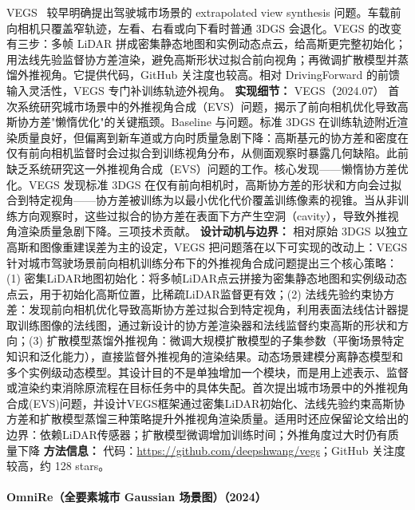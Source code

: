 VEGS~\cite{2407_02945} 较早明确提出驾驶城市场景的 extrapolated view synthesis 问题。车载前向相机只覆盖窄轨迹，左看、右看或向下看时普通 3DGS 会退化。VEGS 的改变有三步：多帧 LiDAR 拼成密集静态地图和实例动态点云，给高斯更完整初始化；用法线先验监督协方差渲染，避免高斯形状过拟合前向视角；再微调扩散模型并蒸馏外推视角。它提供代码，GitHub 关注度也较高。相对 DrivingForward 的前馈输入灵活性，VEGS 专门补训练轨迹外视角。
\textbf{实现细节：} VEGS（2024.07） 首次系统研究城市场景中的外推视角合成（EVS）问题，揭示了前向相机优化导致高斯协方差"懒惰优化"的关键瓶颈。Baseline 与问题。标准 3DGS 在训练轨迹附近渲染质量良好，但偏离到新车道或方向时质量急剧下降：高斯基元的协方差和密度在仅有前向相机监督时会过拟合到训练视角分布，从侧面观察时暴露几何缺陷。此前缺乏系统研究这一外推视角合成（EVS）问题的工作。核心发现——懒惰协方差优化。VEGS 发现标准 3DGS 在仅有前向相机时，高斯协方差的形状和方向会过拟合到特定视角——协方差被训练为以最小优化代价覆盖训练像素的视锥。当从非训练方向观察时，这些过拟合的协方差在表面下方产生空洞（cavity），导致外推视角渲染质量急剧下降。三项技术贡献。
\textbf{设计动机与边界：} 相对原始 3DGS 以独立高斯和图像重建误差为主的设定，VEGS 把问题落在以下可实现的改动上：VEGS针对城市驾驶场景前向相机训练分布下的外推视角合成问题提出三个核心策略：(1) 密集LiDAR地图初始化：将多帧LiDAR点云拼接为密集静态地图和实例级动态点云，用于初始化高斯位置，比稀疏LiDAR监督更有效；(2) 法线先验约束协方差：发现前向相机优化导致高斯协方差过拟合到特定视角，利用表面法线估计器提取训练图像的法线图，通过新设计的协方差渲染器和法线监督约束高斯的形状和方向；(3) 扩散模型蒸馏外推视角：微调大规模扩散模型的子集参数（平衡场景特定知识和泛化能力），直接监督外推视角的渲染结果。动态场景建模分离静态模型和多个实例级动态模型。其设计目的不是单独增加一个模块，而是用上述表示、监督或渲染约束消除原流程在目标任务中的具体失配。首次提出城市场景中的外推视角合成(EVS)问题，并设计VEGS框架通过密集LiDAR初始化、法线先验约束高斯协方差和扩散模型蒸馏三种策略提升外推视角渲染质量。适用时还应保留论文给出的边界：依赖LiDAR传感器；扩散模型微调增加训练时间；外推角度过大时仍有质量下降
\textbf{方法信息：} 代码：\url{https://github.com/deepshwang/vegs}；GitHub 关注度较高，约 128 stars。



\paragraph{OmniRe（全要素城市 Gaussian 场景图）（2024）}

